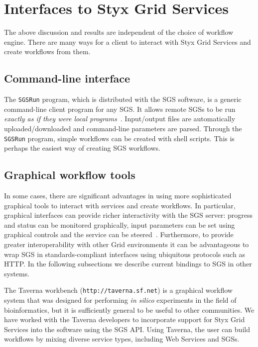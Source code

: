 \documentclass[a4paper]{article}
\begin{document}
\section{Interfaces to Styx Grid Services}\label{sec:interfaces}

The above discussion and results are independent of the choice of workflow engine.  There are many ways for a client to interact with Styx Grid Services and create workflows from them.

\subsection{Command-line interface}\label{sec:sgsrun}
The \texttt{SGSRun} program, which is distributed with the SGS software, is a generic command-line client program for any SGS.  It allows remote SGSs to be run \textit{exactly as if they were local programs}~\cite{blower_lncs:2006, blower_escience:2006}.  Input/output files are automatically uploaded/downloaded and command-line parameters are parsed.  Through the \texttt{SGSRun} program, simple workflows can be created with shell scripts.  This is perhaps the easiest way of creating SGS workflows.

\subsection{Graphical workflow tools}\label{subsec:graphical-workflow}
In some cases, there are significant advantages in using more sophisticated graphical tools to interact with services and create workflows.  In particular, graphical interfaces can provide richer interactivity with the SGS server: progress and status can be monitored graphically, input parameters can be set using graphical controls and the service can be steered~\cite{blower:2005}. Furthermore, to provide greater interoperability with other Grid environments it can be advantageous to wrap SGS in standards-compliant interfaces using ubiquitous protocols such as HTTP. In the following subsections we describe current bindings to SGS in other systems.

The Taverna workbench (\texttt{http://taverna.sf.net}) is a graphical workflow system that was designed for performing {\it in silico} experiments in the field of bioinformatics, but it is sufficiently general to be useful to other communities.  We have worked with the Taverna developers to incorporate support for Styx Grid Services into the software using the SGS API.  Using Taverna, the user can build workflows by mixing diverse service types, including Web Services and SGSs.
\end{document}
